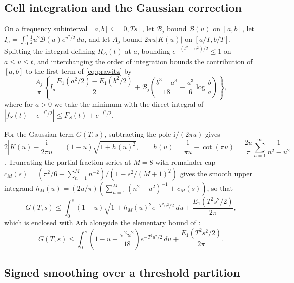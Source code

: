 \documentclass[11pt]{article}
\numberwithin{equation}{section}
\theoremstyle{remark}
\newcommand{\ii}{\mathrm i}
\begin{document}
\subsection{Cell integration and the Gaussian correction}

On a frequency subinterval $[a,b]\subseteq[0,Ts]$, let $\mathcal B_j$ bound
$\mathcal B(u)$ on $[a,b]$, let $I_a=\int_0^a\frac12u^2\mathcal B(u)e^{u^2/2}\,du$,
and let $A_j$ bound $2\pi u|K(u)|$ on $[a/T,b/T]$. Splitting the integral
defining $R_\Delta(t)$ at $a$, bounding $e^{-(t^2-u^2)/2}\le1$ on $a\le u\le t$,
and interchanging the order of integration bounds the contribution of $[a,b]$
to the first term of \eqref{eq:prawitz} by
\begin{equation}\label{eq:fubini-cell}
 \frac{A_j}{\pi}\left\{
 I_a\frac{E_1(a^2/2)-E_1(b^2/2)}2+
 \mathcal B_j\left(\frac{b^3-a^3}{18}
                  -\frac{a^3}{6}\log\frac ba\right)\right\},
\end{equation}
where for $a>0$ we take the minimum with the direct integral of
$|f_S(t)-e^{-t^2/2}|\le F_S(t)+e^{-t^2/2}$.

For the Gaussian term $G(T,s)$, subtracting the pole $\ii/(2\pi u)$ gives
\begin{equation}\label{eq:regular-kernel}
 2\left|K(u)-\frac{\ii}{2\pi u}\right|
   =(1-u)\sqrt{1+h(u)^2},\qquad
 h(u)=\frac1{\pi u}-\cot(\pi u)=\frac{2u}{\pi}\sum_{n=1}^\infty\frac1{n^2-u^2}
\end{equation}
\citep[eq.~4.22.3]{DLMF}. Truncating the partial-fraction series at $M=8$
with remainder cap $c_M(s)=(\pi^2/6-\sum_{n=1}^M n^{-2})/(1-s^2/(M+1)^2)$
gives the smooth upper integrand $h_M(u)=(2u/\pi)(\sum_{n=1}^M(n^2-u^2)^{-1}+c_M(s))$,
so that
\begin{equation}\label{eq:gaussian-majorant}
 G(T,s)\le \int_0^s(1-u)\sqrt{1+h_M(u)^2}e^{-T^2u^2/2}\,du
       +\frac{E_1(T^2s^2/2)}{2\pi},
\end{equation}
which is enclosed with Arb alongside the elementary bound of
\citet[Lemma~4.1]{Shevtsova2012}:
\begin{equation}\label{eq:simple-gaussian}
 G(T,s)\le\int_0^s\left(1-u+\frac{\pi^2u^2}{18}\right)e^{-T^2u^2/2}\,du
               +\frac{E_1(T^2s^2/2)}{2\pi}.
\end{equation}

\subsection{Signed smoothing over a threshold partition}
\label{sec:current-smoothing}
\end{document}
